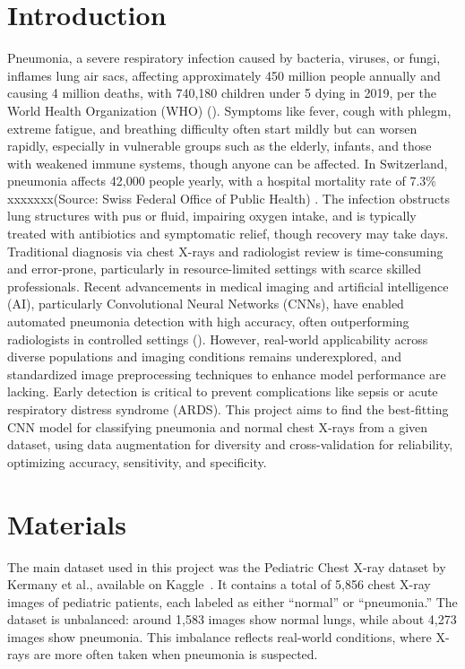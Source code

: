 \documentclass[a4paper,11pt]{article}
\begin{document}
\section{Introduction}
Pneumonia, a severe respiratory infection caused by bacteria, viruses, or fungi, inflames lung air sacs, affecting approximately 450 million people annually and causing 4 million deaths, with 740,180 children under 5 dying in 2019, per the World Health Organization (WHO) (\cite{who_pneumonia_2022}). Symptoms like fever, cough with phlegm, extreme fatigue, and breathing difficulty often start mildly but can worsen rapidly, especially in vulnerable groups such as the elderly, infants, and those with weakened immune systems, though anyone can be affected. In Switzerland, pneumonia affects 42,000 people yearly, with a hospital mortality rate of 7.3\%  xxxxxxx(Source: Swiss Federal Office of Public Health)
. The infection obstructs lung structures with pus or fluid, impairing oxygen intake, and is typically treated with antibiotics and symptomatic relief, though recovery may take days. Traditional diagnosis via chest X-rays and radiologist review is time-consuming and error-prone, particularly in resource-limited settings with scarce skilled professionals. Recent advancements in medical imaging and artificial intelligence (AI), particularly Convolutional Neural Networks (CNNs), have enabled automated pneumonia detection with high accuracy, often outperforming radiologists in controlled settings (\cite{kermany_identifying_2018}). However, real-world applicability across diverse populations and imaging conditions remains underexplored, and standardized image preprocessing techniques to enhance model performance are lacking. Early detection is critical to prevent complications like sepsis or acute respiratory distress syndrome (ARDS). This project aims to find the best-fitting CNN model for classifying pneumonia and normal chest X-rays from a given dataset, using data augmentation for diversity and cross-validation for reliability, optimizing accuracy, sensitivity, and specificity.

\section{Materials}
The main dataset used in this project was the Pediatric Chest X-ray dataset by Kermany et al., available on Kaggle~\cite{kaggle_1_2020}. It contains a total of 5,856 chest X-ray images of pediatric patients, each labeled as either ``normal'' or ``pneumonia.'' The dataset is unbalanced: around 1,583 images show normal lungs, while about 4,273 images show pneumonia. This imbalance reflects real-world conditions, where X-rays are more often taken when pneumonia is suspected.
\end{document}
